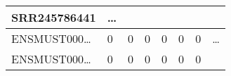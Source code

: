 \documentclass[
]{article}
\begin{document}
\begin{longtable}[]{@{}llllllll@{}}
\begin{minipage}[b]{0.11\columnwidth}
SRR245786441\strut
\end{minipage} & \begin{minipage}[b]{0.03\columnwidth}\raggedright
\ldots{}\strut
\end{minipage}\tabularnewline
\midrule
\endhead
\begin{minipage}[t]{0.11\columnwidth}\raggedright
ENSMUST000\ldots{}\strut
\end{minipage} & \begin{minipage}[t]{0.11\columnwidth}\raggedright
0\strut
\end{minipage} & \begin{minipage}[t]{0.11\columnwidth}\raggedright
0\strut
\end{minipage} & \begin{minipage}[t]{0.11\columnwidth}\raggedright
0\strut
\end{minipage} & \begin{minipage}[t]{0.11\columnwidth}\raggedright
0\strut
\end{minipage} & \begin{minipage}[t]{0.11\columnwidth}\raggedright
0\strut
\end{minipage} & \begin{minipage}[t]{0.11\columnwidth}\raggedright
0\strut
\end{minipage} & \begin{minipage}[t]{0.03\columnwidth}\raggedright
\ldots{}\strut
\end{minipage}\tabularnewline
\begin{minipage}[t]{0.11\columnwidth}\raggedright
ENSMUST000\ldots{}\strut
\end{minipage} & \begin{minipage}[t]{0.11\columnwidth}\raggedright
0\strut
\end{minipage} & \begin{minipage}[t]{0.11\columnwidth}\raggedright
0\strut
\end{minipage} & \begin{minipage}[t]{0.11\columnwidth}\raggedright
0\strut
\end{minipage} & \begin{minipage}[t]{0.11\columnwidth}\raggedright
0\strut
\end{minipage} & \begin{minipage}[t]{0.11\columnwidth}\raggedright
0\strut
\end{minipage} & \begin{minipage}[t]{0.11\columnwidth}\raggedright
0\strut
\end{minipage} & \begin{minipage}[t]{0.03\columnwidth}\raggedright

\end{minipage}
\end{longtable}
\end{document}
